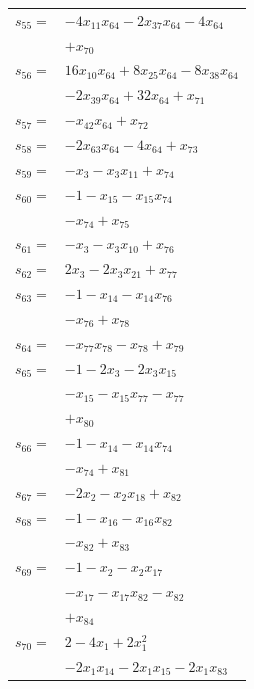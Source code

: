 \begin{longtable}{@{}r@{\;}l@{}}
\(s_{55}=\) & \(\displaystyle -4x_{11}x_{64} -2x_{37}x_{64} -4x_{64}\) \\
 & \(\displaystyle +x_{70}\) \\[3pt]
\(s_{56}=\) & \(\displaystyle 16x_{10}x_{64} +8x_{25}x_{64} -8x_{38}x_{64}\) \\
 & \(\displaystyle -2x_{39}x_{64} +32x_{64} +x_{71}\) \\[3pt]
\(s_{57}=\) & \(\displaystyle -x_{42}x_{64} +x_{72}\) \\[3pt]
\(s_{58}=\) & \(\displaystyle -2x_{63}x_{64} -4x_{64} +x_{73}\) \\[3pt]
\(s_{59}=\) & \(\displaystyle -x_{3} -x_{3}x_{11} +x_{74}\) \\[3pt]
\(s_{60}=\) & \(\displaystyle -1 -x_{15} -x_{15}x_{74}\) \\
 & \(\displaystyle -x_{74} +x_{75}\) \\[3pt]
\(s_{61}=\) & \(\displaystyle -x_{3} -x_{3}x_{10} +x_{76}\) \\[3pt]
\(s_{62}=\) & \(\displaystyle 2x_{3} -2x_{3}x_{21} +x_{77}\) \\[3pt]
\(s_{63}=\) & \(\displaystyle -1 -x_{14} -x_{14}x_{76}\) \\
 & \(\displaystyle -x_{76} +x_{78}\) \\[3pt]
\(s_{64}=\) & \(\displaystyle -x_{77}x_{78} -x_{78} +x_{79}\) \\[3pt]
\(s_{65}=\) & \(\displaystyle -1 -2x_{3} -2x_{3}x_{15}\) \\
 & \(\displaystyle -x_{15} -x_{15}x_{77} -x_{77}\) \\
 & \(\displaystyle +x_{80}\) \\[3pt]
\(s_{66}=\) & \(\displaystyle -1 -x_{14} -x_{14}x_{74}\) \\
 & \(\displaystyle -x_{74} +x_{81}\) \\[3pt]
\(s_{67}=\) & \(\displaystyle -2x_{2} -x_{2}x_{18} +x_{82}\) \\[3pt]
\(s_{68}=\) & \(\displaystyle -1 -x_{16} -x_{16}x_{82}\) \\
 & \(\displaystyle -x_{82} +x_{83}\) \\[3pt]
\(s_{69}=\) & \(\displaystyle -1 -x_{2} -x_{2}x_{17}\) \\
 & \(\displaystyle -x_{17} -x_{17}x_{82} -x_{82}\) \\
 & \(\displaystyle +x_{84}\) \\[3pt]
\(s_{70}=\) & \(\displaystyle 2 -4x_{1} +2x_{1}^{2}\) \\
 & \(\displaystyle -2x_{1}x_{14} -2x_{1}x_{15} -2x_{1}x_{83}\) \\

\end{longtable}
